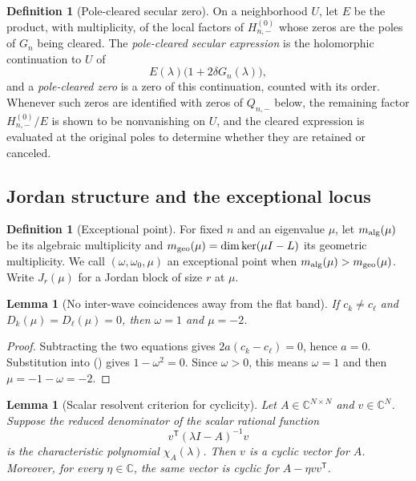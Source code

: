 \documentclass[twoside,10pt]{article}
\numberwithin{equation}{section}
\theoremstyle{slbody}
\newtheorem{lemma}[theorem]{Lemma}
\theoremstyle{definition}
\newtheorem{definition}[theorem]{Definition}
\theoremstyle{remark}
\renewcommand{\eqref}[1]{%
  \textup{{\normalfont(\oldstylenums{\ref{#1}}}\normalfont)}}
\begin{document}
\begin{definition}[Pole-cleared secular zero]
\label{def:pole-cleared-zero}
On a neighborhood $U$, let $E$ be the product, with multiplicity, of the
local factors of $H_{n,-}^{(0)}$ whose zeros are the poles of $G_n$ being
cleared.  The \emph{pole-cleared secular expression} is the holomorphic
continuation to $U$ of
\[
 E(\lambda)\bigl(1+2\delta G_n(\lambda)\bigr),
\]
and a \emph{pole-cleared zero} is a zero of this continuation, counted with
its order.  Whenever such zeros are identified with zeros of $Q_{n,-}$
below, the remaining factor $H_{n,-}^{(0)}/E$ is shown to be nonvanishing on
$U$, and the cleared expression is evaluated at the original poles to
determine whether they are retained or canceled.
\end{definition}

\subsection{Jordan structure and the exceptional locus}

\begin{definition}[Exceptional point]\label{def:exceptional}
For fixed $n$ and an eigenvalue $\mu$, let $m_{\rm alg}(\mu)$ be its algebraic
multiplicity and
$m_{\rm geo}(\mu)=\dim\ker(\mu I-L)$ its geometric multiplicity.  We call
$(\omega,\omega_0,\mu)$ an exceptional point when
$m_{\rm alg}(\mu)>m_{\rm geo}(\mu)$.
Write $J_r(\mu)$ for a Jordan block of size $r$ at $\mu$.
\end{definition}

\begin{lemma}[No inter-wave coincidences away from the flat band]
\label{lem:no-coincidences}
If $c_k\ne c_\ell$ and $D_k(\mu)=D_\ell(\mu)=0$, then $\omega=1$ and
$\mu=-2$.
\end{lemma}

\begin{proof}
Subtracting the two equations gives
$2a(c_k-c_\ell)=0$, hence $a=0$.  Substitution into
\eqref{eq:Dk} gives $1-\omega^2=0$.  Since $\omega>0$, this means
$\omega=1$ and then $\mu=-1-\omega=-2$.
\end{proof}

\begin{lemma}[Scalar resolvent criterion for cyclicity]
\label{lem:scalar-resolvent-cyclicity}
Let $A\in\mathbb C^{N\times N}$ and $v\in\mathbb C^N$.  Suppose the
reduced denominator of the scalar rational function
\[
 v^{\mathsf T}(\lambda I-A)^{-1}v
\]
is the characteristic polynomial $\chi_A(\lambda)$.  Then $v$ is a
cyclic vector for $A$.  Moreover, for every $\eta\in\mathbb C$, the
same vector is cyclic for $A-\eta vv^{\mathsf T}$.
\end{lemma}
\end{document}
